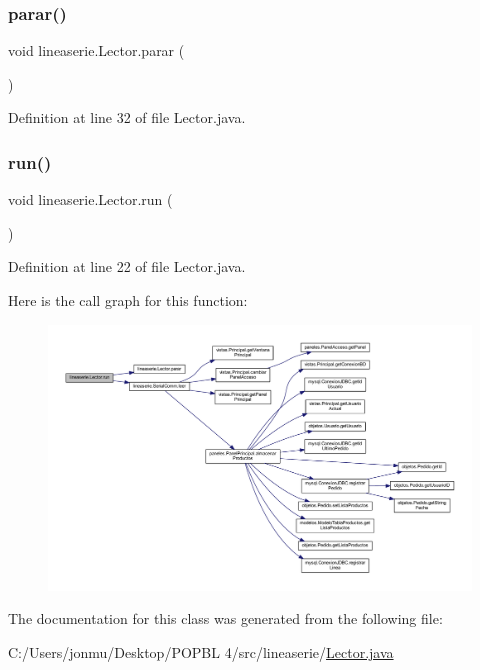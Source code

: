 \subsubsection{\texorpdfstring{parar()}{parar()}}
{\footnotesize\ttfamily void lineaserie.\+Lector.\+parar (\begin{DoxyParamCaption}{ }\end{DoxyParamCaption})}



Definition at line 32 of file Lector.\+java.

\mbox{\label{classlineaserie_1_1_lector_ac57211de70ab9a4bd7aa80ab491f7fca}} 
\subsubsection{\texorpdfstring{run()}{run()}}
{\footnotesize\ttfamily void lineaserie.\+Lector.\+run (\begin{DoxyParamCaption}{ }\end{DoxyParamCaption})}



Definition at line 22 of file Lector.\+java.

Here is the call graph for this function\+:
\nopagebreak
\begin{figure}[H]
\begin{center}
\leavevmode
\includegraphics[width=350pt]{classlineaserie_1_1_lector_ac57211de70ab9a4bd7aa80ab491f7fca_cgraph}
\end{center}
\end{figure}


The documentation for this class was generated from the following file\+:\begin{DoxyCompactItemize}
\item 
C\+:/\+Users/jonmu/\+Desktop/\+P\+O\+P\+B\+L 4/src/lineaserie/\mbox{\hyperlink{_lector_8java}{Lector.\+java}}\end{DoxyCompactItemize}

